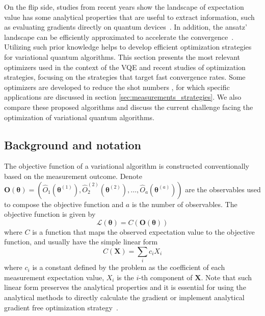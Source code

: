 On the flip side, studies from recent years show the landscape of expectation value has some analytical properties that are useful to extract information, such as evaluating gradients directly on quantum devices~\cite{nakanishi_sequential_2020,ostaszewskiStructureOptimizationParameterized2021, Romero2019,schuld_evaluating_2019}. In addition, the ansatz' landscape can be efficiently approximated to accelerate the convergence~\cite{koczor_quantum_2020,parrish_jacobi_2019}. Utilizing such prior knowledge helps to develop efficient optimization strategies for variational quantum algorithms.   
This section presents the most relevant optimizers used in the context of the VQE and recent studies of optimization strategies, focusing on the strategies that target fast convergence rates. Some optimizers are developed to reduce the shot numbers \cite{Arrasmith2020,Kubler2020adaptiveoptimizer}, for which specific applications are discussed in  section \ref{sec:measurements_strategies}. We also compare these proposed algorithms and discuss the current challenge facing the optimization of variational quantum algorithms.  

\subsection{Background and notation}  

The objective function of a variational algorithm is constructed conventionally based on the measurement outcome. Denote $\mathbf{O}(\boldsymbol{\theta}) = (\hat{O}_1(\boldsymbol{\theta}^{(1)}),\hat{O}_2^{(2)}(\boldsymbol{\theta}^{(2)}),\dots,\hat{O}_a(\boldsymbol{\theta}^{(a)}))$ are the observables used to compose the objective function and $a$ is the number of observables. The objective function is given by 
\begin{equation}
    \mathcal{L}(\boldsymbol{\theta}) = C(\mathbf{O}(\boldsymbol{\theta}))
\end{equation}
where $C$ is a function that maps the observed expectation value to the objective function, and usually have the simple linear form 
\begin{equation}
    C(\mathbf{X}) = \sum_i c_i X_i
\end{equation}
where $c_i$ is a constant defined by the problem as the coefficient of each measurement expectation value, $X_i$ is the $i$-th component of $\mathbf{X}$. Note that such linear form preserves the analytical properties and it is essential for using the analytical methods to directly calculate the gradient or implement analytical gradient free optimization strategy~\cite{CostFunction2020Cao,nakanishi_sequential_2020,ostaszewskiStructureOptimizationParameterized2021,koczor_quantum_2020,schuld_evaluating_2019,Romero2019}.  

